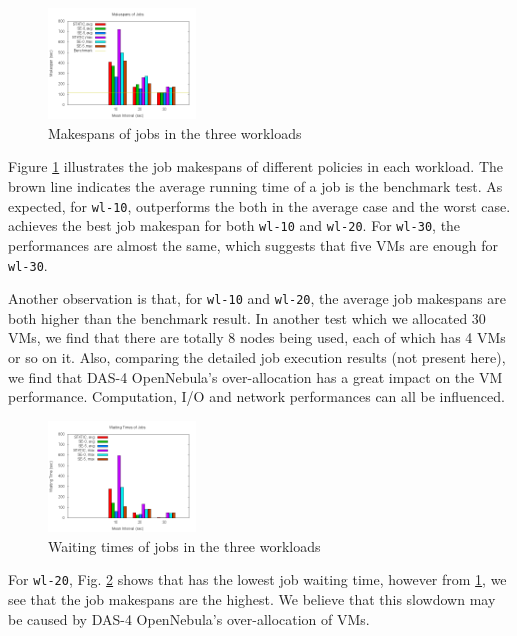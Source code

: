 \begin{figure}[!t]
\centering
\includegraphics[width=0.35\textwidth]{pictures/all-makespans.png}
\caption{Makespans of jobs in the three workloads}
\label{figure_jobmakespan}
\end{figure}

Figure \ref{figure_jobmakespan} illustrates the job makespans of different
policies in each workload. The brown line indicates the average running time
of a job is the benchmark test. As expected, for \texttt{wl-10},
\SE{} outperforms the \STATIC{} both in the average case
and the worst case. \SEfive{} achieves the best job makespan for both
\texttt{wl-10} and \texttt{wl-20}. For \texttt{wl-30}, the performances are
almost the same, which suggests that five VMs are enough for \texttt{wl-30}.

Another observation is that, for \texttt{wl-10} and \texttt{wl-20}, the
average job makespans are both higher than the benchmark result. In another
test which we allocated 30 VMs, we find that there are totally 8 nodes being
used, each of which has 4 VMs or so on it. Also, comparing the detailed
job execution results (not present here), we find that DAS-4 OpenNebula's
over-allocation has a great impact on the VM performance. Computation, I/O
and network performances can all be influenced.

\begin{figure}[!t]
\centering
\includegraphics[width=0.35\textwidth]{pictures/all-waittimes.png}
\caption{Waiting times of jobs in the three workloads}
\label{figure_jobwaittime}
\end{figure}

For \texttt{wl-20}, Fig. \ref{figure_jobwaittime} shows that \SEzero{} has
the lowest job waiting time, however from \ref{figure_jobmakespan}, we
see that the job makespans are the highest. We believe that this slowdown
may be caused by DAS-4 OpenNebula's over-allocation of VMs.

